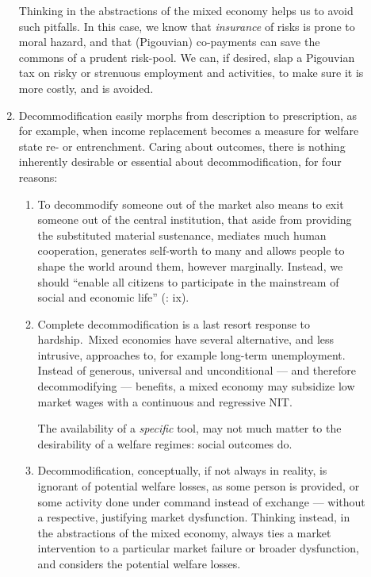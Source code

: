\begin{description}
\begin{enumerate}
		Thinking in the abstractions of the mixed economy helps us to avoid such pitfalls. In this case, we know that \emph{insurance} of risks is prone to moral hazard, and that (Pigouvian) co-payments can save the commons of a prudent risk-pool. We can, if desired, slap a Pigouvian tax on risky or strenuous employment and activities, to make sure it is more costly, and is avoided.

		\item Decommodification easily morphs from description to prescription, as for example, when income replacement becomes a measure for welfare state re- or entrenchment. %
		Caring about outcomes, there is nothing inherently desirable or essential about decommodification, for four reasons:
			\begin{enumerate}
				\item To decommodify someone out of the market also means to exit someone out of the central institution, that aside from providing the substituted material sustenance, mediates much human cooperation, generates self-worth to many and allows people to shape the world around them, however marginally. Instead, we should ``enable all citizens to participate in the mainstream of social and economic life'' (\citealt{Esping-Andersen2002}: ix).

				\item Complete decommodification is a last resort response to hardship.~Mixed economies have several alternative, and less intrusive, approaches to, for example long-term unemployment. Instead of generous, universal and unconditional --- and therefore decommodifying --- benefits, a mixed economy may subsidize low market wages with a continuous and regressive \gls{NIT}.

				The availability of a \emph{specific} tool, may not much matter to the desirability of a welfare regimes: social outcomes do.

				\item Decommodification, conceptually, if not always in reality, is ignorant of potential welfare losses, as some person is provided, or some activity done under command instead of exchange --- without a respective, justifying market dysfunction. Thinking instead, in the abstractions of the mixed economy, always ties a market intervention to a particular market failure or broader dysfunction, and considers the potential welfare losses.
			\end{enumerate}


\end{enumerate}
\end{description}

